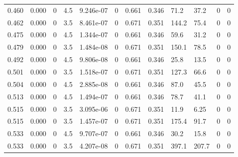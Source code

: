 \documentclass[preview]{standalone}
\begin{document}
{{{\begin{tabular}{L{1.2cm}C{1.2cm} C{0.3cm}C{0.5cm} C{1.4cm}C{1.4cm} C{1.4cm}C{1.4cm} C{1.6cm}C{1.6cm} C{1.6cm}C{1.6cm}}
  0.460  &  0.000  & 0     & 4.5 &  9.246e-07  & 0  &  0.661&   0.346& 71.2 & 37.2   &  0 & 0  \\ 
  0.462  &  0.000  & 0     & 3.5 &  8.461e-07  & 0  &  0.671&   0.351& 144.2 & 75.4   &  0 & 0  \\ 
  0.475  &  0.000  & 0     & 4.5 &  1.344e-07  & 0  &  0.661&   0.346& 59.6 & 31.2   &  0 & 0  \\ 
  0.479  &  0.000  & 0     & 3.5 &  1.484e-08  & 0  &  0.671&   0.351& 150.1 & 78.5   &  0 & 0  \\ 
  0.492  &  0.000  & 0     & 4.5 &  9.806e-08  & 0  &  0.661&   0.346& 25.8 & 13.5   &  0 & 0  \\ 
  0.501  &  0.000  & 0     & 3.5 &  1.518e-07  & 0  &  0.671&   0.351& 127.3 & 66.6   &  0 & 0  \\ 
  0.504  &  0.000  & 0     & 4.5 &  2.885e-08  & 0  &  0.661&   0.346& 87.0 & 45.5   &  0 & 0  \\ 
  0.513  &  0.000  & 0     & 4.5 &  1.494e-07  & 0  &  0.661&   0.346& 78.7 & 41.1   &  0 & 0  \\ 
  0.515  &  0.000  & 0     & 3.5 &  3.095e-06  & 0  &  0.671&   0.351& 11.9 & 6.25   &  0 & 0  \\ 
  0.515  &  0.000  & 0     & 3.5 &  1.457e-07  & 0  &  0.671&   0.351& 175.4 & 91.7   &  0 & 0  \\ 
  0.533  &  0.000  & 0     & 4.5 &  9.707e-07  & 0  &  0.661&   0.346& 30.2 & 15.8   &  0 & 0  \\ 
  0.533  &  0.000  & 0     & 3.5 &  4.207e-08  & 0  &  0.671&   0.351& 397.1 & 207.7   &  0 & 0  \\ 
\hline 
\end{tabular} 

}}}
\end{document}
